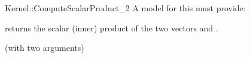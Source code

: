 \begin{ccRefFunctionObjectConcept}{Kernel::ComputeScalarProduct_2}
A model for this must provide:


{returns the scalar (inner) product of the two vectors  and .}

\ccRefines
{} (with two arguments)

\ccSeeAlso
{}\\

\end{ccRefFunctionObjectConcept}
